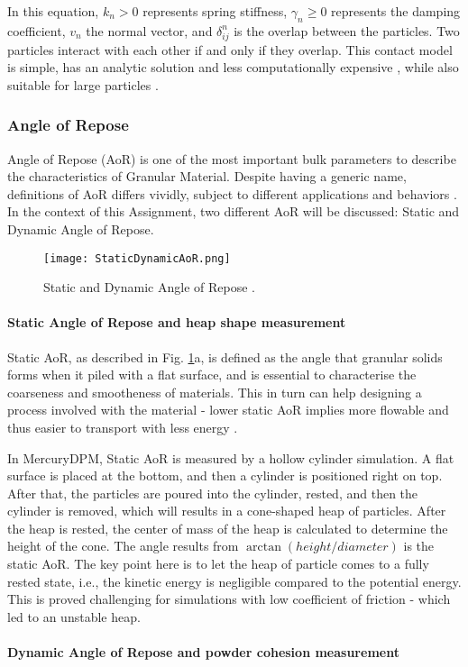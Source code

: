In this equation, $k_n > 0$ represents spring stiffness, $\gamma_n \geq 0$ represents the damping coefficient, $v_n$ the normal vector, and $\delta_{ij}^n$ is the overlap between the particles. Two particles interact with each other if and only if they overlap. This contact model is simple, has an analytic solution and less computationally expensive \cite{NAVARRO2013}, while also suitable for large particles \cite{MercuryDPM}. 


\subsubsection{Angle of Repose}
Angle of Repose (AoR) is one of the most important bulk parameters to describe the characteristics of Granular Material. Despite having a generic name, definitions of AoR differs vividly, subject to different applications and behaviors \cite{BEAKAWIALHASHEMI2018397}. In the context of this Assignment, two different AoR will be discussed: Static and Dynamic Angle of Repose. 

\begin{figure}[H]
    \centering
    \texttt{[image: StaticDynamicAoR.png]}
    \caption{Static and Dynamic Angle of Repose \cite{PhysRevLett.82.1156}.}
    \label{fig:StaticDynamicAoR}
\end{figure}


\paragraph{Static Angle of Repose and heap shape measurement} \label{section:staticAoR}

Static AoR, as described in Fig. \ref{fig:StaticDynamicAoR}a, is defined as the angle that granular solids forms when it piled with a flat surface, and is essential to characterise the coarseness and smootheness of materials. This in turn can help designing a process involved with the material - lower static AoR implies more flowable and thus easier to transport with less energy \cite{TEFERRA201945}. 

In MercuryDPM, Static AoR is measured by a hollow cylinder simulation. A flat surface is placed at the bottom, and then a cylinder is positioned right on top. After that, the particles are poured into the cylinder, rested, and then the cylinder is removed, which will results in a cone-shaped heap of particles. After the heap is rested, the center of mass of the heap is calculated to determine the height of the cone. The angle results from $\arctan(height/diameter)$ is the static AoR. The key point here is to let the heap of particle comes to a fully rested state, i.e., the kinetic energy is negligible compared to the potential energy. This is proved challenging for simulations with low coefficient of friction - which led to an unstable heap. 

\paragraph{Dynamic Angle of Repose and powder cohesion measurement}


